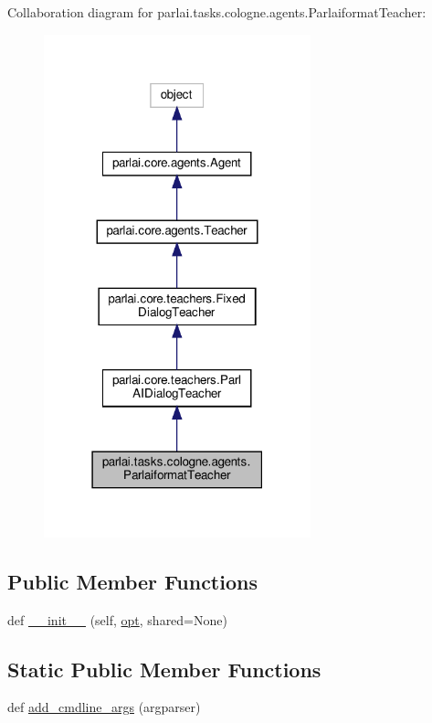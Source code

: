 Collaboration diagram for parlai.\+tasks.\+cologne.\+agents.\+Parlaiformat\+Teacher\+:
\nopagebreak
\begin{figure}[H]
\begin{center}
\leavevmode
\includegraphics[width=219pt]{d6/d40/classparlai_1_1tasks_1_1cologne_1_1agents_1_1ParlaiformatTeacher__coll__graph}
\end{center}
\end{figure}
\subsection*{Public Member Functions}
\begin{DoxyCompactItemize}
\item 
def \hyperlink{classparlai_1_1tasks_1_1cologne_1_1agents_1_1ParlaiformatTeacher_ad9d9559b0ee3eb828922727fa79dcae8}{\+\_\+\+\_\+init\+\_\+\+\_\+} (self, \hyperlink{classparlai_1_1core_1_1agents_1_1Teacher_a3ce6243860ce978a897922863ed32fa4}{opt}, shared=None)
\end{DoxyCompactItemize}
\subsection*{Static Public Member Functions}
\begin{DoxyCompactItemize}
\item 
def \hyperlink{classparlai_1_1tasks_1_1cologne_1_1agents_1_1ParlaiformatTeacher_aa7751152b46ca44ceb7f4bce0d951502}{add\+\_\+cmdline\+\_\+args} (argparser)
\end{DoxyCompactItemize}
